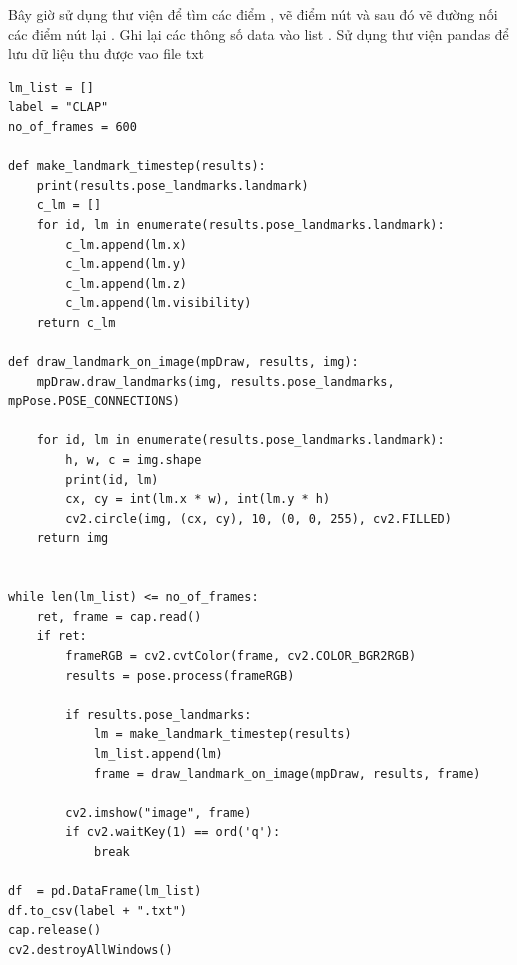 Bây giờ sử dụng thư viện để tìm các điểm , vẽ điểm nút và sau đó vẽ đường nối các điểm nút lại . Ghi lại các thông số data vào list . Sử dụng thư viện pandas để lưu dữ liệu thu được vao file txt 
\begin{lstlisting}[style=codePython]
lm_list = []
label = "CLAP"
no_of_frames = 600

def make_landmark_timestep(results):
    print(results.pose_landmarks.landmark)
    c_lm = []
    for id, lm in enumerate(results.pose_landmarks.landmark):
        c_lm.append(lm.x)
        c_lm.append(lm.y)
        c_lm.append(lm.z)
        c_lm.append(lm.visibility)
    return c_lm

def draw_landmark_on_image(mpDraw, results, img):
    mpDraw.draw_landmarks(img, results.pose_landmarks, mpPose.POSE_CONNECTIONS)

    for id, lm in enumerate(results.pose_landmarks.landmark):
        h, w, c = img.shape
        print(id, lm)
        cx, cy = int(lm.x * w), int(lm.y * h)
        cv2.circle(img, (cx, cy), 10, (0, 0, 255), cv2.FILLED)
    return img


while len(lm_list) <= no_of_frames:
    ret, frame = cap.read()
    if ret:
        frameRGB = cv2.cvtColor(frame, cv2.COLOR_BGR2RGB)
        results = pose.process(frameRGB)

        if results.pose_landmarks:
            lm = make_landmark_timestep(results)
            lm_list.append(lm)
            frame = draw_landmark_on_image(mpDraw, results, frame)

        cv2.imshow("image", frame)
        if cv2.waitKey(1) == ord('q'):
            break

df  = pd.DataFrame(lm_list)
df.to_csv(label + ".txt")
cap.release()
cv2.destroyAllWindows()
\end{lstlisting}

